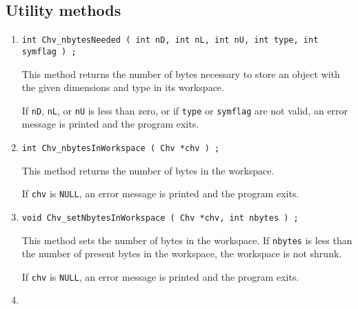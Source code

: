 \subsection{Utility methods}
\label{subsection:Chv:proto:utilities}
\par
\begin{enumerate}
\item
\begin{verbatim}
int Chv_nbytesNeeded ( int nD, int nL, int nU, int type, int symflag ) ;
\end{verbatim}
This method returns the number of bytes necessary to store an
object with the given dimensions and type in its workspace.
\par {}
If {\tt nD}, {\tt nL}, or {\tt nU} is less than zero,
or if {\tt type} or {\tt symflag} are not valid,
an error message is printed and the program exits.
\item
\begin{verbatim}
int Chv_nbytesInWorkspace ( Chv *chv ) ;
\end{verbatim}
This method returns the number of bytes in the workspace.
\par {}
If {\tt chv} is {\tt NULL},
an error message is printed and the program exits.
\item
\begin{verbatim}
void Chv_setNbytesInWorkspace ( Chv *chv, int nbytes ) ;
\end{verbatim}
This method sets the number of bytes in the workspace.
If {\tt nbytes} is less than the number of present bytes in the
workspace, the workspace is not shrunk.
\par {}
If {\tt chv} is {\tt NULL},
an error message is printed and the program exits.
\item

\end{enumerate}
